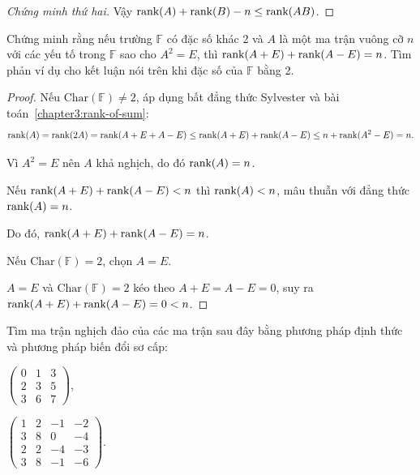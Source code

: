 \begin{proof}[Chứng minh thứ hai]
    Vậy $\text{rank}(A) + \text{rank}(B) - n \le \text{rank}(AB)$.
\end{proof}

\begin{exercise}
    Chứng minh rằng nếu trường $\mathbb{F}$ có đặc số khác 2 và $A$ là một ma trận vuông cỡ $n$ với các yếu tố trong $\mathbb{F}$ sao cho $A^{2} = E$, thì $\text{rank}(A + E) + \text{rank}(A - E) = n$. Tìm phản ví dụ cho kết luận nói trên khi đặc số của $\mathbb{F}$ bằng 2.
\end{exercise}

\begin{proof}
    Nếu $\text{Char}(\mathbb{F})\ne 2$, áp dụng bất đẳng thức Sylvester và bài toán~\ref{chapter3:rank-of-sum}:
    \[
        \text{rank}(A) = \text{rank}(2A) = \text{rank}(A+E + A-E) \le \text{rank}(A+E) + \text{rank}(A-E) \le n + \text{rank}(A^{2} - E) = n.
    \]
    
    Vì $A^{2} = E$ nên $A$ khả nghịch, do đó $\text{rank}(A) = n$.
    
    Nếu $\text{rank}(A + E) + \text{rank}(A - E) < n$ thì $\text{rank}(A) < n$, mâu thuẫn với đẳng thức $\text{rank}(A) = n$.
    
    Do đó, $\text{rank}(A + E) + \text{rank}(A - E) = n$.
    
    \bigskip
    
    Nếu $\text{Char}(\mathbb{F}) = 2$, chọn $A = E$.
    
    $A = E$ và $\text{Char}(\mathbb{F}) = 2$ kéo theo $A + E = A - E = 0$, suy ra $\text{rank}(A + E) + \text{rank}(A - E) = 0 < n$.
\end{proof}

\begin{exercise}
    Tìm ma trận nghịch đảo của các ma trận sau đây bằng phương pháp định thức và phương pháp biến đổi sơ cấp:
    \begin{center}
        \begin{enumerate*}[label = (\alph*)]
            \item $\begin{pmatrix}
                          0 & 1 & 3 \\
                          2 & 3 & 5 \\
                          3 & 6 & 7
                      \end{pmatrix}$,
            \item $\begin{pmatrix}
                          1 & 2 & -1 & -2 \\
                          3 & 8 & 0  & -4 \\
                          2 & 2 & -4 & -3 \\
                          3 & 8 & -1 & -6
                      \end{pmatrix}$.
        \end{enumerate*}
    \end{center}
\end{exercise}

